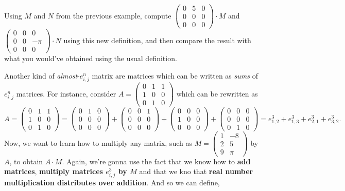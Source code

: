 \begin{exerc}
	Using $M$ and $N$ from the previous example, compute $\begin{pmatrix}
	0 & 5 & 0\\
	0&0&0\\
	0&0&0
	\end{pmatrix}\cdot M$ and $\begin{pmatrix}
	0 & 0 & 0\\
	0&0&-\pi\\
	0&0&0
	\end{pmatrix}\cdot N$ using this new definition, and then compare the result with what you would've obtained using the usual definition.
\end{exerc}

\bigskip
Another kind of \textit{almost}-$e^n_{i,j}$ matrix are matrices which can be written as \textit{sums} of $e^n_{i,j}$ matrices. For instance, consider $A=\begin{pmatrix}
0 & 1 & 1\\
1 & 0 & 0\\
0 & 1 & 0
\end{pmatrix}$ which can be rewritten as
\[A=\begin{pmatrix}
0 & 1 & 1\\
1 & 0 & 0\\
0 & 1 & 0
\end{pmatrix}=\begin{pmatrix}
0 & 1 & 0\\
0&0&0\\
0&0&0
\end{pmatrix}+ \begin{pmatrix}
0 & 0 & 1 \\
0 & 0 & 0 \\
0 & 0 & 0 
\end{pmatrix}  + \begin{pmatrix}
0 & 0 & 0 \\
1 & 0 & 0 \\
0 & 0 & 0 
\end{pmatrix}  + \begin{pmatrix}
0 & 0 & 0 \\
0 & 0 & 0 \\
0 & 1 & 0 
\end{pmatrix}  =e^3_{1,2}+e^3_{1,3}+e^3_{2,1}+e^3_{3,2}.\] Now, we want to learn how to multiply any matrix, such as $M=\begin{pmatrix}
1 & -8\\
2 & 5\\
9 & \pi
\end{pmatrix}$ by $A$, to obtain $A\cdot M$. Again, we're gonna use the fact that we know how to \textbf{add matrices}, \textbf{multiply matrices $e^3_{i,j}$ by $M$} and that we kno that \textbf{real number multiplication distributes over addition}. And so we can define,
